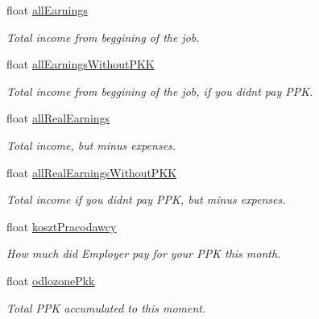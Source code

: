 \begin{DoxyCompactItemize}
\mbox{\label{structmonthStats_aa49362b899c1b961d233380bbbee17db}} 
float \mbox{\hyperlink{structmonthStats_aa49362b899c1b961d233380bbbee17db}{all\+Earnings}}
\begin{DoxyCompactList}\small\item\em Total income from beggining of the job. \end{DoxyCompactList}\item 
\mbox{\label{structmonthStats_a2d612ef924dbd955d2d4fa870e345ea4}} 
float \mbox{\hyperlink{structmonthStats_a2d612ef924dbd955d2d4fa870e345ea4}{all\+Earnings\+Without\+P\+KK}}
\begin{DoxyCompactList}\small\item\em Total income from beggining of the job, if you didn\textquotesingle{}t pay P\+PK. \end{DoxyCompactList}\item 
\mbox{\label{structmonthStats_aabf7d7adb2795191d7312b87e36db8fb}} 
float \mbox{\hyperlink{structmonthStats_aabf7d7adb2795191d7312b87e36db8fb}{all\+Real\+Earnings}}
\begin{DoxyCompactList}\small\item\em Total income, but minus expenses. \end{DoxyCompactList}\item 
\mbox{\label{structmonthStats_a5ba5cdd6ba789eecb367199211509fc7}} 
float \mbox{\hyperlink{structmonthStats_a5ba5cdd6ba789eecb367199211509fc7}{all\+Real\+Earnings\+Without\+P\+KK}}
\begin{DoxyCompactList}\small\item\em Total income if you didn\textquotesingle{}t pay P\+PK, but minus expenses. \end{DoxyCompactList}\item 
\mbox{\label{structmonthStats_a8375c69fa1c622f0ddf52cfb00575af8}} 
float \mbox{\hyperlink{structmonthStats_a8375c69fa1c622f0ddf52cfb00575af8}{koszt\+Pracodawcy}}
\begin{DoxyCompactList}\small\item\em How much did Employer pay for your P\+PK this month. \end{DoxyCompactList}\item 
\mbox{\label{structmonthStats_ab6311be5258bf8ab5e89f71e868c0b85}} 
float \mbox{\hyperlink{structmonthStats_ab6311be5258bf8ab5e89f71e868c0b85}{odlozone\+Pkk}}
\begin{DoxyCompactList}\small\item\em Total P\+PK accumulated to this moment. \end{DoxyCompactList}\end{DoxyCompactItemize}


